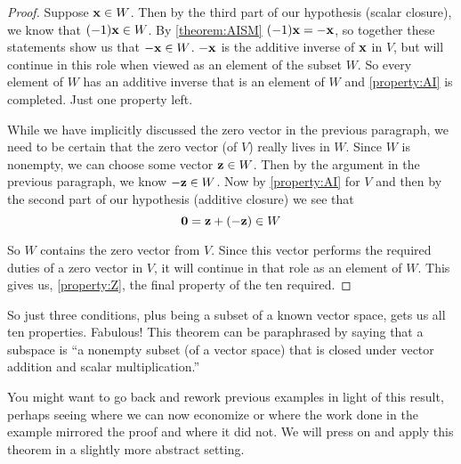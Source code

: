 \documentclass{ximera}
\begin{document}
\begin{theorem}
\begin{proof}
    Suppose $\mathbf{x}\in W$.  Then by the third part of our hypothesis
    (scalar closure), we know that $(-1)\mathbf{x}\in W$.  By
    \ref{theorem:AISM} $(-1)\mathbf{x}=\mathbf{-x}$, so together these
    statements show us that $\mathbf{-x}\in W$.  $\mathbf{-x}$ is the
    additive inverse of $\mathbf{x}$ in $V$, but will continue in this
    role when viewed as an element of the subset $W$.  So every
    element of $W$ has an additive inverse that is an element of $W$
    and \ref{property:AI} is completed.  Just one property left.

    While we have implicitly discussed the zero vector in the previous
    paragraph, we need to be certain that the zero vector (of $V$)
    really lives in $W$.  Since $W$ is nonempty, we can choose some
    vector $\mathbf{z}\in W$.  Then by the argument in the previous
    paragraph, we know $\mathbf{-z}\in W$.  Now by \ref{property:AI} for
    $V$ and then by the second part of our hypothesis (additive
    closure) we see that
    \[
      \mathbf{0}=\mathbf{z}+(\mathbf{-z})\in W
    \]

    So $W$ contains the zero vector from $V$.  Since this vector
    performs the required duties of a zero vector in $V$, it will
    continue in that role as an element of $W$. This gives us,
    \ref{property:Z}, the final property of the ten required.

\end{proof}
\end{theorem}

So just three conditions, plus being a subset of a known vector space,
gets us all ten properties.  Fabulous!  This theorem can be
paraphrased by saying that a subspace is ``a nonempty subset (of a
vector space) that is closed under vector addition and scalar
multiplication.''

You might want to go back and rework previous examples in light of
this result, perhaps seeing where we can now economize or where the
work done in the example mirrored the proof and where it did not.  We
will press on and apply this theorem in a slightly more abstract
setting.
\end{document}
